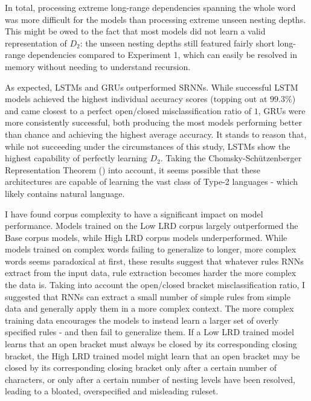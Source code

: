 In total, processing extreme long-range dependencies spanning the whole word was more difficult for the models than processing extreme unseen nesting depths. This might be owed to the fact that most models did not learn a valid representation of $D_{2}$: the unseen nesting depths still featured fairly short long-range dependencies compared to Experiment 1, which can easily be resolved in memory without needing to understand recursion.

As expected, LSTMs and GRUs outperformed SRNNs. While successful LSTM models achieved the highest individual accuracy scores (topping out at $99.3\%$) and came closest to a perfect open/closed misclassification ratio of $1$, GRUs were more consistently successful, both producing the most models performing better than chance and achieving the highest average accuracy. It stands to reason that, while not succeeding under the circumstances of this study, LSTMs show the highest capability of perfectly learning $D_{2}$. Taking the Chomsky-Schützenberger Representation Theorem (\cite{Chomsky1963}) into account, it seems possible that these architectures are capable of learning the vast class of Type-2 languages - which likely contains natural language.

I have found corpus complexity to have a significant impact on model performance. Models trained on the Low LRD corpus largely outperformed the Base corpus models, while High LRD corpus models underperformed. While models trained on complex words failing to generalize to longer, more complex words seems paradoxical at first, these results suggest that whatever rules RNNs extract from the input data, rule extraction becomes harder the more complex the data is. Taking into account the open/closed bracket misclassification ratio, I suggested that RNNs can extract a small number of simple rules from simple data and generally apply them in a more complex context. The more complex training data encourages the models to instead learn a larger set of overly specified rules - and then fail to generalize them. If a Low LRD trained model learns that an open bracket must always be closed by its corresponding closing bracket, the High LRD trained model might learn that an open bracket may be closed by its corresponding closing bracket only after a certain number of characters, or only after a certain number of nesting levels have been resolved, leading to a bloated, overspecified and misleading ruleset.

